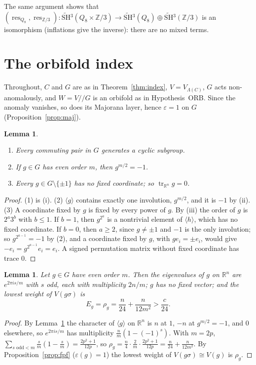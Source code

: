 \documentclass[11pt]{amsart}
\newtheorem{lemma}[theorem]{Lemma}
\theoremstyle{definition}
\newcommand{\Z}{\mathbb{Z}}
\newcommand{\R}{\mathbb{R}}
\newcommand{\res}{\operatorname{res}}
\newcommand{\SH}{\widetilde{\mathrm{SH}}{}^3}
\newcommand{\orb}{/\!\!/}
\begin{document}
The same argument shows that $(\res_{Q_8},\res_{\Z/3})\colon\SH(Q_8\times\Z/3)\to\SH(Q_8)\oplus\SH(\Z/3)$
is an isomorphism (inflations give the inverse): there are no mixed terms.

\section{The orbifold index}\label{sec:index}

Throughout, $C$ and $G$ are as in Theorem~\ref{thm:index}, $V=V_{\Lambda(C)}$, $G$ acts non-anomalously,
and $W=V\orb G$ is an orbifold as in Hypothesis~ORB. Since the anomaly vanishes, so does its Majorana
layer, hence $\varepsilon=1$ on $G$ (Proposition~\ref{prop:maj}).

\begin{lemma}\label{lem:groups}
\begin{enumerate}
\item Every commuting pair in $G$ generates a cyclic subgroup.
\item If $g\in G$ has even order $m$, then $g^{m/2}=-1$.
\item Every $g\in G\setminus\{\pm1\}$ has no fixed coordinate; so $\operatorname{tr}_{\R^n}g=0$.
\end{enumerate}
\end{lemma}

\begin{proof}
(1) is (i). (2) $\langle g\rangle$ contains exactly one involution, $g^{m/2}$, and it is $-1$ by (ii).
(3) A coordinate fixed by $g$ is fixed by every power of $g$. By (iii) the order of $g$ is $2^a3^b$ with
$b\le1$. If $b=1$, then $g^{2^a}$ is a nontrivial element of $\langle h\rangle$, which has no fixed
coordinate. If $b=0$, then $a\ge2$, since $g\ne\pm1$ and $-1$ is the only involution; so
$g^{2^{a-1}}=-1$ by (2), and a coordinate fixed by $g$, with $ge_i=\pm e_i$, would give
$-e_i=g^{2^{a-1}}e_i=e_i$. A signed permutation matrix without fixed coordinate has trace $0$.
\end{proof}

\begin{lemma}\label{lem:vacuum}
Let $g\in G$ have even order $m$. Then the eigenvalues of $g$ on $\R^n$ are $e^{2\pi is/m}$ with $s$ odd,
each with multiplicity $2n/m$; $g$ has no fixed vector; and the lowest weight of $V(g\sigma)$ is
\[
  E_g=\rho_g=\frac n{24}+\frac n{12m^2}>\frac c{24}.
\]
\end{lemma}

\begin{proof}
By Lemma~\ref{lem:groups} the character of $\langle g\rangle$ on $\R^n$ is $n$ at $1$, $-n$ at
$g^{m/2}=-1$, and $0$ elsewhere, so $e^{2\pi is/m}$ has multiplicity $\frac nm(1-(-1)^s)$. With $m=2p$,
$\sum_{s\text{ odd}<m}\frac sm(1-\frac sm)=\frac{2p^2+1}{12p}$, so $\rho_g=\frac n4\cdot\frac
2m\cdot\frac{2p^2+1}{12p}=\frac n{24}+\frac n{12m^2}$. By Proposition~\ref{prop:fpf} ($\varepsilon(g)=1$)
the lowest weight of $V(g\sigma)\cong V(g)$ is $\rho_g$.
\end{proof}
\end{document}
